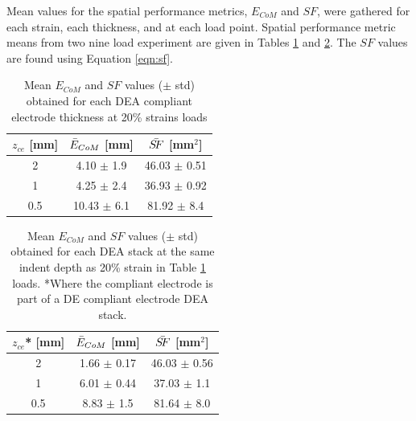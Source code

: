 Mean values for the spatial performance metrics, $E_{CoM}$ and $S\!F$, were gathered for each strain, each thickness, and at each load point. Spatial performance metric means from two nine load experiment are given in Tables \ref{tab:spatial_metrics_ce} and \ref{tab:spatial_metrics_dea}. The $S\!F$ values are found using Equation \ref{eqn:sf}.

\begin{table}[H]
	\centering
	\caption{Mean $E_{CoM}$ and $S\!F$ values ($\pm$ std) obtained for each DEA compliant electrode thickness at 20\% strains loads}
	\label{tab:spatial_metrics_ce}
	\begin{tabular}{c|c|c}
		$z_{ce}$ [mm] & $\Bar{E}_{CoM}$ [mm] & $\Bar{S\!F}$ [mm$^2$] \\
		\hline
		2 & 4.10 $\pm$ 1.9 & 46.03 $\pm$ 0.51\\ %
		1 & 4.25 $\pm$ 2.4 & 36.93 $\pm$ 0.92\\
		0.5 & 10.43 $\pm$ 6.1 & 81.92 $\pm$ 8.4\\
	\end{tabular}
\end{table}

\begin{table}[H]
	\centering
	\caption{Mean $E_{CoM}$ and $S\!F$ values ($\pm$ std) obtained for each DEA stack at the same indent depth as 20\% strain in Table \ref{tab:spatial_metrics_ce} loads. *Where the compliant electrode is part of a DE compliant electrode DEA stack.}
	\label{tab:spatial_metrics_dea}
	\begin{tabular}{c|c|c}
		$z_{ce}$* [mm] & $\Bar{E}_{CoM}$ [mm] & $\Bar{S\!F}$ [mm$^2$] \\
		\hline
		2 & 1.66 $\pm$ 0.17 & 46.03 $\pm$ 0.56\\ %
		1 & 6.01 $\pm$ 0.44 & 37.03 $\pm$ 1.1\\ 
		0.5 & 8.83 $\pm$ 1.5 & 81.64 $\pm$ 8.0\\ %
	\end{tabular}
\end{table}

